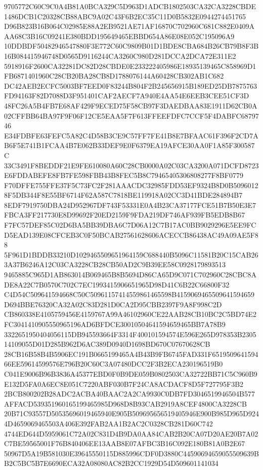 \documentclass[UTF8,fontset=fandol,zihao=-4,a4paper]{ctexart}
\begin{document}
{{9705772C60C9C0A4B81A0BCA329C5D963D1ADCB1802503CA32CA3228CBDE1486DCB1C20328CB88ABC9A02C43F6B2EC35C11D0B5832E0944274451765
D96B823B16B064C02985E88A2EB9521AE71AF16870C702960C681C882E0409AAA68C3B16C09241E380BDD195649465EBBD654A86E08E052C195096A9
10DDBDF50482946547880F3E772C60C9809B01D1BDE8CBA684B26CB79B8F3B16B084415946748D0565D9116244CA3260C980D281DCCA2DCA72E311E2
5918916F2600CA32281DC82D28CBDE0E233222405986E18935139465C858969D1FB6871401960C28CB20BA28CB8D1788076144A60428CB302AB1C682
DC42AEB2ECFC5003BF7EED0F83244B804F2B245656915B189ED25DB7875763FD94163F82D7088D3F951401CAF2AECF7A940E4AA54E6EEB3CEE51CF3D
48FC26A5B4FB7E68AF429F9ECED75F58CB97F3DAEDBAA83E1911D62CB0A02CFFBB64BA97F9F06F12CE5EAA5F7F613FFEEFDFC7CCF5F4DABFC6879746
E34FDBFE63FEFC5A82C4D58B3CE9C57FF7FE41B8E7BFAAC61F396F2CD7AB6F5E741B1FCAA4B7E062B33DEF9E0F6379EA19AFCE30AA0F1A85F300587C
33C3491F8BEDDF21E9FE610080A60C28CB0000A02C03CA3200A071DCFD8723E6FDDABEFE8FB7FE598FBB43B8FEC5B8C79465405306808277F8BF0779
F70DFFE755FFE37F5C73FC2F281AAACDC32985FDD53EF9324B8D0B50960128F5DB344F8E55BF6714F62A587C7818BE119918A02CC3D41BDE284894B7
8EDF7919750DBA24D952967DF743F53331E0A4B23CA37177FCE51B7B50E3E7FBCA3FF217730E8D99692F20ED2159F9FDA219DF746AF939FB5EDB8B67
F7FC57DEF85C02D6BA5BB39DBA6C7D06A12C7B17AC0BB9029296E5EE9FCD5EAD139E08CFCEB3C0F50BCAB27561628606ACECCB86438AC49A09AE5F88
5F961D1BDDB33210D1029465509651964159C688440B5096C11581B20C15CAB263A37B6246A12C03CA3228CB28CB50AD2C9B39EE58C0928179893513
9465885C965D1AB863014B069465B8B5694D86CA65D9C071C702960C28CBC8ADE8A22C7B0570C702C7EC1993415906651965D98D41C6B22C66800F32
C4D54C509641594668C50C50961157414559861465598B4159069465509641594659D694BBE76320CA32A02C83D281D0CA2D95CBB2397F9A8F998C2D
CB860338E4105759456E4159767A99A46102960CE22AAB28CB10BC2C5BD74E2FC3041410905550965196AD6BFDCE30010504641594659465BB7A78B9
3322651950404056115DB945593664F3314F400101594574E596E265D978353B230514109055D01D285B962D6AC389D0940D1698BD670C07670628CB
28CB16B58B4B5906EC191B0665199465A4B43B9FB6745FAD331F651950964159466EE59614599576E796B20C60C3A07480DCC2F3B2ECA230196519B0
C041E9006B96B3836A45377EBD0F0B9DE059B0802503CA32722BB71C5C960B9E132D5FA0A6EC8E051C7220ABF030B7F24CA8ACDACF8D5F727795F3B2
2BCB800202B28ADC2ACBA40BAAC2A2CA9930C0DB7FD3046519946504B577AFFACD539351960165199465985D968D8B93CAB2919A8CEF4800CA3228CB
20B71C93557D50535696019465940E905B509695656519405946E900B985D965D9244D4659069465503A406E392FAB2AA1B2AC2C0328CB281D60C742
4744ED644D5959061C72A02C831D4B9DA0AA84CAB2B20CA07D20AE20B7A02C7BE59565001F76B840406EE13AAB8E07AFBC3B16C092E180B81A0B2E67
50967D5A19B581030E39645550115D885996CDF0D3880C44590694659055509639BB2C5BC5B7E6690ECA32A08080AC82B2CC1929D54D509601141034
}}
\end{document}
